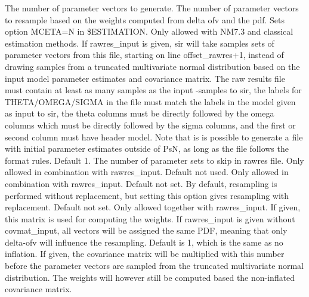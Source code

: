 \begin{optionlist}
The number of parameter vectors to generate.
\nextopt
{}
The number of parameter vectors to resample based on the weights
computed from delta ofv and the pdf.
\nextopt
{}
Sets option MCETA=N in \$ESTIMATION. Only allowed with NM7.3 and classical estimation methods.
\nextopt
{}
If rawres\_input is given, sir will take samples sets of parameter
vectors from this file, starting on line offset\_rawres+1, instead of
drawing samples from a truncated multivariate normal distribution 
based on the input model parameter estimates and 
covariance matrix.
The raw results file must contain at least as many 
samples as the input -samples to sir, the labels for  THETA/OMEGA/SIGMA 
in the file must match the labels in the model given as input 
to sir, the theta columns must be directly followed by the omega columns 
which must be directly followed by the sigma columns, and the first or
second column must have header model. Note that is is 
possible to generate a file with initial parameter estimates outside 
of PsN, as long as the file follows the format rules.
\nextopt
{}
Default 1. The number of parameter sets to skip in rawres file. Only allowed in combination with rawres\_input.
\nextopt
{}
Default not used. Only allowed in combination with rawres\_input.
\nextopt
{}
Default not set. By default, resampling is performed without replacement, but setting this option gives resampling with replacement.
\nextopt
{}
Default not set. 
\nextopt
{}
Only allowed together with rawres\_input. If given, this matrix is
used for computing the weights. If rawres\_input is given without covmat\_input, all vectors will be assigned the same PDF, meaning that only delta-ofv will influence the resampling.
\nextopt
{}
Default is 1, which is the same as no inflation. If given, the covariance
matrix will be multiplied with this number before the parameter vectors
are sampled from the truncated multivariate normal distribution.
The weights will however still be computed based the non-inflated covariance matrix. 
\nextopt
\end{optionlist}


